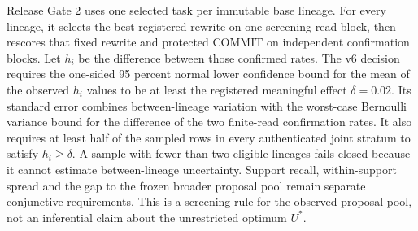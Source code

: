Release Gate 2 uses one selected task per immutable base lineage. For every lineage, it selects the best registered rewrite on one screening read block, then rescores that fixed rewrite and protected COMMIT on independent confirmation blocks. Let $h_i$ be the difference between those confirmed rates. The v6 decision requires the one-sided 95 percent normal lower confidence bound for the mean of the observed $h_i$ values to be at least the registered meaningful effect $\delta=0.02$. Its standard error combines between-lineage variation with the worst-case Bernoulli variance bound for the difference of the two finite-read confirmation rates. It also requires at least half of the sampled rows in every authenticated joint stratum to satisfy $h_i\geq\delta$. A sample with fewer than two eligible lineages fails closed because it cannot estimate between-lineage uncertainty. Support recall, within-support spread and the gap to the frozen broader proposal pool remain separate conjunctive requirements. This is a screening rule for the observed proposal pool, not an inferential claim about the unrestricted optimum $U^*$.
